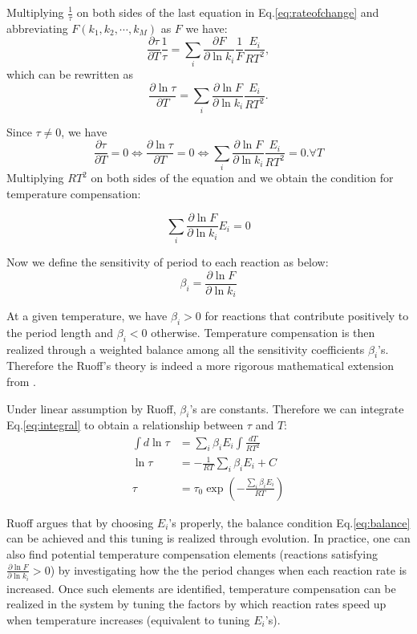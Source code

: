 \documentclass[a4paper,10pt]{article}
\numberwithin{equation}{section}
\begin{document}
Multiplying $\frac{1}{\tau}$ on both sides of the last equation in Eq.\ref{eq:rateofchange} and abbreviating $F(k_1,k_2,\cdots ,k_M)$ as $F$ we have:
\begin{equation*}
\frac{\partial \tau}{\partial T}\frac{1}{\tau}= \sum_i \frac{\partial F}{\partial \ln k_i} \frac{1}{F}  \frac{E_i}{RT^2}, 
\end{equation*}
which can be rewritten as
\begin{equation}\label{eq:integral}
\frac{\partial \ln \tau}{\partial T}= \sum_i \frac{\partial \ln F}{\partial \ln k_i} \frac{E_i}{RT^2}. 
\end{equation}

Since $\tau\neq 0$, we have
\[ \frac{\partial \tau}{\partial T} =0 \iff \frac{\partial \ln \tau}{\partial T}=0 \iff \sum_i \frac{\partial \ln F}{\partial \ln k_i} \frac{E_i}{RT^2}=0. \forall T\] 
Multiplying $RT^2$ on both sides of the equation and we obtain the  condition for temperature compensation:

\begin{equation}\label{eq:balance}
\sum_i \frac{\partial \ln  F}{\partial \ln k_i} E_i = 0
\end{equation}

Now we define the sensitivity of period to each reaction as below:
\[ \beta_i=\frac{\partial \ln  F}{\partial \ln k_i}\]

At a given temperature, we have $\beta_i>0$  for reactions that contribute positively to the period length and $\beta_i< 0$ otherwise. Temperature compensation is then realized through a weighted balance among all the sensitivity coefficients $\beta_i$'s. Therefore the Ruoff's theory is indeed  a more rigorous mathematical extension from \citet{hastings1957}. 

Under linear assumption by Ruoff, $\beta_i$'s are constants. Therefore we can integrate Eq.\ref{eq:integral} to obtain a relationship between $\tau$ and $T$:
\begin{equation}
\begin{split}
\int d\ln \tau&=\sum_i \beta_i E_i \int \frac{dT}{RT^2}\\
\ln \tau &= -\frac{1}{RT}\sum_i \beta_i E_i +C\\
\tau &= \tau_0 \exp\left({-\frac{\sum_i \beta_i E_i}{RT}}\right)
\end{split}
\end{equation}

Ruoff argues that by choosing $E_i$'s properly, the balance condition Eq.\ref{eq:balance}   can be achieved and  this  tuning is realized through evolution. In practice, one can also find potential temperature compensation elements (reactions satisfying $\frac{\partial \ln  F}{\partial \ln k_i}>0$) by investigating how the the period changes when each reaction rate is increased. Once such elements are identified, temperature compensation can be realized in the system by tuning the factors by which reaction rates speed up when temperature increases (equivalent to tuning $E_i$'s).
\end{document}

